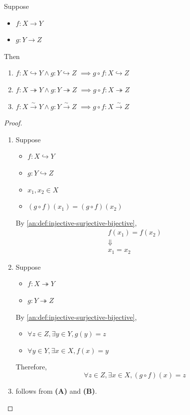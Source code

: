 \begin{theorem} \label{an:thm:properties-of-composition-functions}
  Suppose
  \begin{itemize}
    \item $f: X \to Y$
    \item $g: Y \to Z$
  \end{itemize}
  Then
  \begin{enumerate}[label=\textbf{(\Alph*)}]
    \item $f: X \hookrightarrow Y \land g: Y \hookrightarrow Z$ $\implies g \circ f: X \hookrightarrow Z$
    \item $f: X \twoheadrightarrow Y \land g: Y \twoheadrightarrow Z$ $\implies g \circ f: X \twoheadrightarrow Z$
    \item $f: X \xrightarrow{\sim} Y \land g: Y \xrightarrow{\sim} Z$ $\implies g \circ f: X \xrightarrow{\sim} Z$
  \end{enumerate}
\end{theorem}

\begin{proof}
  \leavevmode\par
  \begin{enumerate}[label=\textbf{(\Alph*)}]
    \item Suppose
          \begin{itemize}
            \item $f: X \hookrightarrow Y$
            \item $g: Y \hookrightarrow Z$
            \item $x_{1}, x_{2} \in X$
            \item $(g \circ f)(x_{1}) = (g \circ f)(x_{2})$
          \end{itemize}
          By \cref{an:def:injective-surjective-bijective},
          \[
            \begin{array}{c}
              f(x_{1}) = f(x_{2}) \\
              \Downarrow          \\
              x_{1} = x_{2}
            \end{array}
          \]
    \item Suppose
          \begin{itemize}
            \item $f: X \twoheadrightarrow Y$
            \item $g: Y \twoheadrightarrow Z$
          \end{itemize}
          By \cref{an:def:injective-surjective-bijective},
          \begin{itemize}
            \item $\forall z \in Z, \exists y \in Y, g(y) = z$
            \item $\forall y \in Y, \exists x \in X, f(x) = y$
          \end{itemize}
          Therefore,
          \[
            \forall z \in Z, \exists x \in X, (g \circ f)(x) = z
          \]
    \item follows from \textbf{(A)} and \textbf{(B)}.
  \end{enumerate}
\end{proof}
